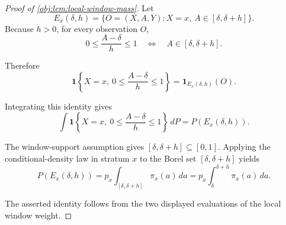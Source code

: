 \begin{proof}[Proof of \cref{obj:lem:local-window-mass}]
Let
\[
E_x(\delta,h)
=
\{O=(X,A,Y):X=x,\ A\in[\delta,\delta+h]\}.
\]
Because \(h>0\), for every observation \(O\),
\[
0\le\frac{A-\delta}{h}\le1
\quad\Longleftrightarrow\quad
A\in[\delta,\delta+h].
\] %

Therefore
\[
\mathbf 1\left\{X=x,\ 0\le\frac{A-\delta}{h}\le1\right\}
=
\mathbf 1_{E_x(\delta,h)}(O).
\] %

Integrating this identity gives
\[
\int
\mathbf 1\left\{X=x,\ 0\le\frac{A-\delta}{h}\le1\right\}\,dP
=
P(E_x(\delta,h)).
\] %

The window-support assumption gives
\([\delta,\delta+h]\subseteq[0,1]\). Applying the conditional-density law in
stratum \(x\) to the Borel set \([\delta,\delta+h]\) yields
\[
P(E_x(\delta,h))
=
p_x\int_{[\delta,\delta+h]}\pi_x(a)\,da
=
p_x\int_{\delta}^{\delta+h}\pi_x(a)\,da .
\] %

The asserted identity follows from the two displayed evaluations of the local window weight. %
\end{proof}
